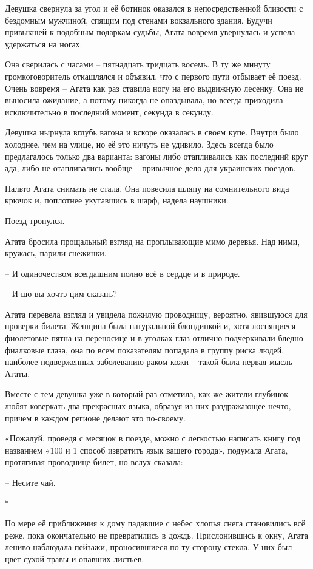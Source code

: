 \documentclass[
  a5paperpaper,
  DIV=11,
  numbers=noendperiod]{scrreprt}
\begin{document}
Девушка свернула за угол и её ботинок оказался в непосредственной
близости с бездомным мужчиной, спящим под стенами вокзального здания.
Будучи привыкшей к подобным подаркам судьбы, Агата вовремя увернулась и
успела удержаться на ногах.

Она сверилась с часами -- пятнадцать тридцать восемь. В ту же минуту
громкоговоритель откашлялся и объявил, что с первого пути отбывает её
поезд. Очень вовремя -- Агата как раз ставила ногу на его выдвижную
лесенку. Она не выносила ожидание, а потому никогда не опаздывала, но
всегда приходила исключительно в последний момент, секунда в секунду.

Девушка нырнула вглубь вагона и вскоре оказалась в своем купе. Внутри
было холоднее, чем на улице, но её это ничуть не удивило. Здесь всегда
было предлагалось только два варианта: вагоны либо отапливались как
последний круг ада, либо не отапливались вообще -- привычное дело для
украинских поездов.

Пальто Агата снимать не стала. Она повесила шляпу на сомнительного вида
крючок и, поплотнее укутавшись в шарф, надела наушники.

Поезд тронулся.

Агата бросила прощальный взгляд на проплывающие мимо деревья. Над ними,
кружась, парили снежинки.

-- И одиночеством всегдашним полно всё в сердце и в природе.

-- И шо вы хочтэ цим сказать?

Агата перевела взгляд и увидела пожилую проводницу, вероятно, явившуюся
для проверки билета. Женщина была натуральной блондинкой и, хотя
лоснящиеся фиолетовые пятна на переносице и в уголках глаз отлично
подчеркивали бледно фиалковые глаза, она по всем показателям попадала в
группу риска людей, наиболее подверженных заболеванию раком кожи --
такой была первая мысль Агаты.

Вместе с тем девушка уже в который раз отметила, как же жители глубинок
любят коверкать два прекрасных языка, образуя из них раздражающее нечто,
причем в каждом регионе делают это по-своему.

«Пожалуй, проведя с месяцок в поезде, можно с легкостью написать книгу
под названием «100 и 1 способ извратить язык вашего города», подумала
Агата, протягивая проводнице билет, но вслух сказала:

-- Несите чай.

*

По мере её приближения к дому падавшие с небес хлопья снега становились
всё реже, пока окончательно не превратились в дождь. Прислонившись к
окну, Агата лениво наблюдала пейзажи, проносившиеся по ту сторону
стекла. У них был цвет сухой травы и опавших листьев.
\end{document}
